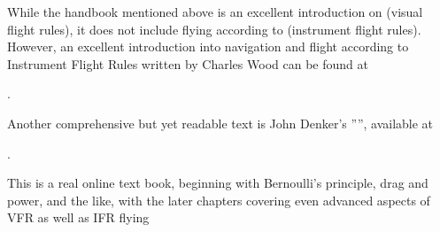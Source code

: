 While the handbook mentioned above is an excellent introduction on  (visual
flight rules), it does not include flying according to  (instrument flight
rules). However, an excellent introduction into navigation and flight according to
Instrument Flight Rules written by Charles Wood can be found at

.

Another comprehensive but yet readable text is John Denker's
'''', available at
\medskip

.
\medskip

 \noindent
This is a real online text book, beginning with Bernoulli's principle, drag and power,
and the like, with the later chapters covering even advanced aspects of VFR as well as
IFR flying


